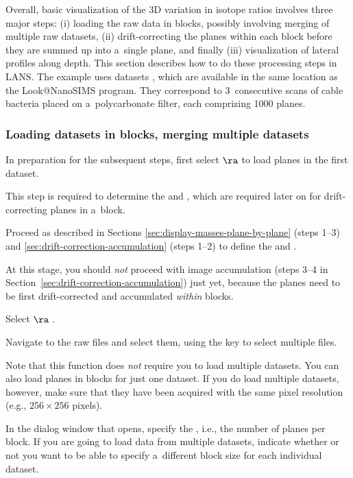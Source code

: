 Overall, basic visualization of the 3D variation in isotope ratios involves three major steps: (i) loading the raw data in blocks, possibly involving merging of multiple raw datasets, (ii) drift-correcting the planes within each block before they are summed up into a~single plane, and finally (iii) visualization of lateral profiles along depth. This section describes how to do these processing steps in LANS. The example uses datasets , which are available in the same location as the Look@NanoSIMS program. They correspond to 3~consecutive scans of cable bacteria placed on a~polycarbonate filter, each comprizing 1000 planes.

\subsubsection{Loading datasets in blocks, merging multiple datasets}
\setcounter{step}{0}

\s In preparation for the subsequent steps, first select  $\ra$  to load  planes in the first dataset.

\bul This step is required to determine the  and , which are required later on for drift-correcting planes in a~block.

\s Proceed as described in Sections \ref{sec:display-masses-plane-by-plane} (steps 1--3) and \ref{sec:drift-correction-accumulation} (steps 1--2) to define the  and .

\bul At this stage, you should \emph{not} proceed with image accumulation (steps 3--4 in Section~\ref{sec:drift-correction-accumulation}) just yet, because the planes need to be first drift-corrected and accumulated \emph{within} blocks.

\s Select  $\ra$ . 

\bul Navigate to the raw files and select them, using the  key to select multiple files.

\bul Note that this function does \emph{not} require you to load multiple datasets. You can also load planes in blocks for just one dataset. If you do load multiple datasets, however, make sure that they have been acquired with the same pixel resolution (e.g., $256\times 256$ pixels).

\s In the dialog window that opens, specify the , i.e., the number of planes per block. If you are going to load data from multiple datasets, indicate whether or not you want to be able to specify a~different block size for each individual dataset.

